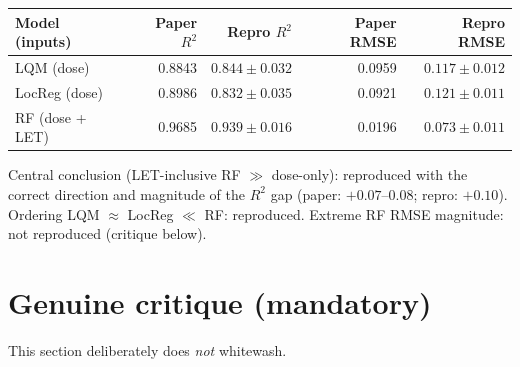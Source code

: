 \documentclass[11pt]{article}
\begin{document}
\begin{center}
\begin{tabular}{lrrrr}
\toprule
Model (inputs) & Paper $R^2$ & Repro $R^2$ & Paper RMSE & Repro RMSE \\
\midrule
LQM (dose)             & 0.8843 & $0.844 \pm 0.032$ & 0.0959 & $0.117 \pm 0.012$ \\
LocReg (dose)          & 0.8986 & $0.832 \pm 0.035$ & 0.0921 & $0.121 \pm 0.011$ \\
RF (dose + LET)        & 0.9685 & $0.939 \pm 0.016$ & 0.0196 & $0.073 \pm 0.011$ \\
\bottomrule
\end{tabular}
\end{center}

Central conclusion (LET-inclusive RF $\gg$ dose-only): reproduced with the correct direction and magnitude of the $R^2$ gap (paper: $+0.07$--$0.08$; repro: $+0.10$). Ordering LQM $\approx$ LocReg $\ll$ RF: reproduced. Extreme RF RMSE magnitude: not reproduced (critique below).

\section{Genuine critique (mandatory)}
This section deliberately does \emph{not} whitewash.
\end{document}
